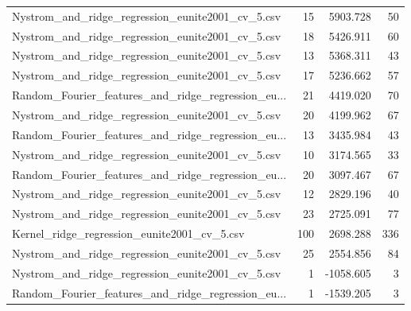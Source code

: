 \begin{tabularx}{\textwidth}{lrrr}
  Nystrom\_and\_ridge\_regression\_eunite2001\_cv\_5.csv &       15 &  5903.728 &            50 \\
  Nystrom\_and\_ridge\_regression\_eunite2001\_cv\_5.csv &       18 &  5426.911 &            60 \\
  Nystrom\_and\_ridge\_regression\_eunite2001\_cv\_5.csv &       13 &  5368.311 &            43 \\
  Nystrom\_and\_ridge\_regression\_eunite2001\_cv\_5.csv &       17 &  5236.662 &            57 \\
Random\_Fourier\_features\_and\_ridge\_regression\_eu... &       21 &  4419.020 &            70 \\
  Nystrom\_and\_ridge\_regression\_eunite2001\_cv\_5.csv &       20 &  4199.962 &            67 \\
Random\_Fourier\_features\_and\_ridge\_regression\_eu... &       13 &  3435.984 &            43 \\
  Nystrom\_and\_ridge\_regression\_eunite2001\_cv\_5.csv &       10 &  3174.565 &            33 \\
Random\_Fourier\_features\_and\_ridge\_regression\_eu... &       20 &  3097.467 &            67 \\
  Nystrom\_and\_ridge\_regression\_eunite2001\_cv\_5.csv &       12 &  2829.196 &            40 \\
  Nystrom\_and\_ridge\_regression\_eunite2001\_cv\_5.csv &       23 &  2725.091 &            77 \\
       Kernel\_ridge\_regression\_eunite2001\_cv\_5.csv &      100 &  2698.288 &           336 \\
  Nystrom\_and\_ridge\_regression\_eunite2001\_cv\_5.csv &       25 &  2554.856 &            84 \\
  Nystrom\_and\_ridge\_regression\_eunite2001\_cv\_5.csv &        1 & -1058.605 &             3 \\
Random\_Fourier\_features\_and\_ridge\_regression\_eu... &        1 & -1539.205 &             3 \\
\bottomrule
\end{tabularx}
